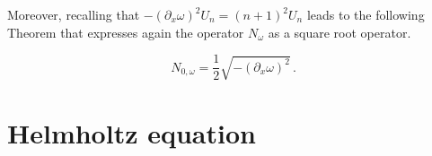 \documentclass[a4paper]{article}
\begin{document}
Moreover, recalling that $-(\partial_x\omega)^2 U_n = (n+1)^2 U_n$ leads to the following Theorem that expresses
again the operator $N_\omega$ as a square root operator.
\begin{theorem} 
	\label{the:NeumannInverseLaplace}
	\begin{equation}
	N_{0,\omega} = \frac12\sqrt{-(\partial_x \omega)^{2}}\,.
	\end{equation}
\end{theorem}
%
\section{Helmholtz equation}
	
\end{document}
